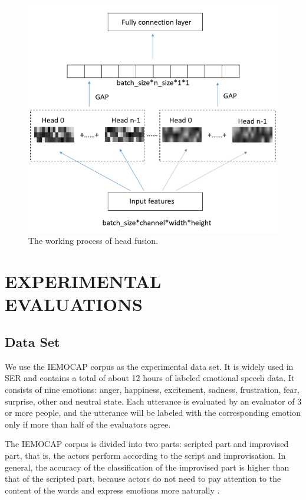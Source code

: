 \documentclass[10pt, conference, compsocconf]{IEEEtran}
\begin{document}
\begin{figure}[h]
	\centering
	\includegraphics[width=0.95\linewidth]{pic/head_fusion}
	\caption{The working process of head fusion.}
	\label{headFusion}
\end{figure}

\section{EXPERIMENTAL EVALUATIONS}
\subsection{Data Set}
We use the IEMOCAP corpus as the experimental data set. It is widely used in SER and contains a total of about 12 hours of labeled emotional speech data. It consists of nine emotions: anger, happiness, excitement, sadness, frustration, fear, surprise, other and neutral state. Each utterance is evaluated by an evaluator of 3 or more people, and the utterance will be labeled with the corresponding emotion only if more than half of the evaluators agree. 

The IEMOCAP corpus is divided into two parts: scripted part and improvised part, that is, the actors perform according to the script and improvisation. In general, the accuracy of the classification of the improvised part is higher than that of the scripted part, because actors do not need to pay attention to the content of the words and express emotions more naturally \cite{li2018attention,tarantino2019self}.
\end{document}
